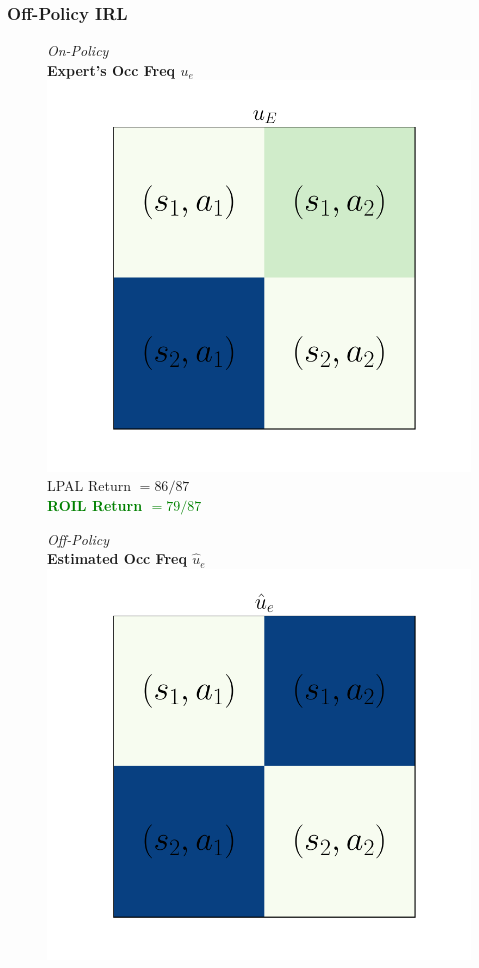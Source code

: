 \documentclass{beamer}
\begin{document}
\begin{frame}
\frametitle{Off-Policy IRL}
\begin{figure}
  \begin{center}
  \begin{minipage}{0.45\linewidth}
    \centering
    \emph{On-Policy}\\
    \textbf{Expert's Occ Freq $u_e$}
    \includegraphics[width=\linewidth]{./plots/all_state/ue.pdf}
    LPAL Return $= 86/87$ \\
    \textcolor{green}{\textbf{ROIL Return $= 79/87$}}
  \end{minipage}
  \begin{minipage}{0.45\linewidth}
    \centering
    \emph{Off-Policy}\\
    \textbf{Estimated Occ Freq $\hat{u}_e$}
    \includegraphics[width=\linewidth]{./plots/all_state/uehat.pdf}

\end{minipage}
\end{center}
\end{figure}
\end{frame}
\end{document}
